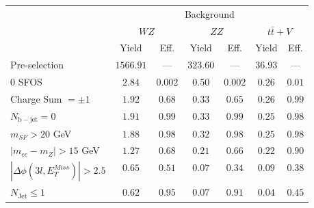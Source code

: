 \begin{tabular}{l||c|c||c|c||c|c}
\hline
 &  \multicolumn{6}{c}{Background} \\
 & \multicolumn{2}{c||}{$WZ$} & \multicolumn{2}{c||}{$ZZ$} & \multicolumn{2}{c}{$t\bar{t}+V$} \\ 
 & Yield & Eff. & Yield & Eff. & Yield & Eff. \\
\hline\hline
Pre-selection &  $1566.91$ & --- &  $323.60$ &  --- &  $36.93$ &  --- \\
\hline
0 SFOS &  $2.84$ &  $0.002$ &  $0.50$ &  $0.002$ &  $0.26$ &  $0.01$ \\
\hline
Charge Sum $= \pm 1$ &  $1.92$ &  $0.68$ &  $0.33$ &  $0.65$ &  $0.26$ &  $0.99$ \\
\hline
$N_{\mathrm{b-jet}} = 0$ &  $1.91$ &  $0.99$ &  $0.33$ &  $0.99$ &  $0.25$ &  $0.98$ \\
\hline
$m_{SF} > 20$ GeV &  $1.88$ &  $0.98$ &  $0.32$ &  $0.98$ &  $0.25$ &  $0.98$ \\
\hline
$|m_{ee} - m_{Z}| > 15$ GeV &  $1.27$ &  $0.68$ &  $0.21$ &  $0.66$ &  $0.22$ &  $0.90$ \\
\hline
$|\Delta\phi(3l,E_{T}^{Miss})| > 2.5$ &  $0.65$ &  $0.51$ &  $0.07$ &  $0.34$ &  $0.09$ &  $0.38$ \\
\hline
$N_{\mathrm{Jet}} \leq 1$ &  $0.62$ &  $0.95$ &  $0.07$ &  $0.91$ &  $0.04$ &  $0.45$ \\
\hline
\end{tabular}



